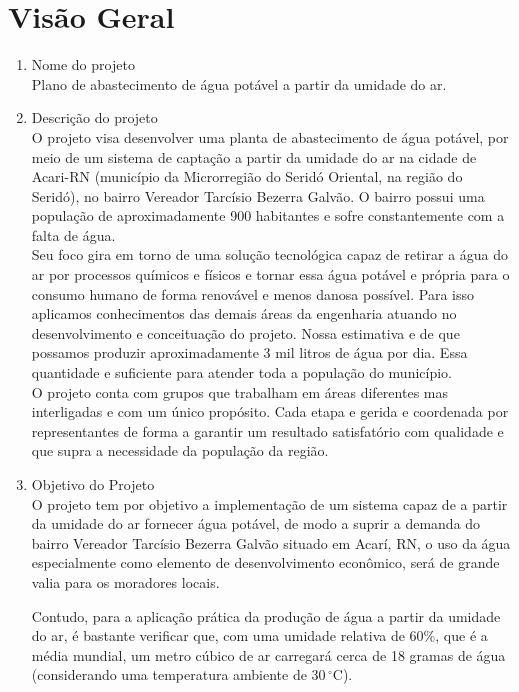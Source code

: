 \section*{Visão Geral}
\begin{enumerate}
  
  \item Nome do projeto\\
  Plano de abastecimento de água potável a partir da umidade do ar.
  
  \item Descrição do projeto\\
  O projeto visa desenvolver uma planta de abastecimento de água potável, por meio de um sistema de captação a partir da umidade do ar na cidade de Acari-RN (município da Microrregião do Seridó Oriental, na região do Seridó), no bairro Vereador Tarcísio Bezerra Galvão. O bairro possui uma população de aproximadamente 900 habitantes e sofre constantemente com a falta de água. \\
  Seu foco gira em torno de uma solução tecnológica  capaz de retirar a água do ar  por processos químicos e físicos e tornar essa água potável e própria para o consumo humano de forma renovável e menos danosa possível. Para isso aplicamos conhecimentos das demais áreas da engenharia atuando no desenvolvimento e conceituação do projeto. Nossa estimativa e de que possamos produzir aproximadamente 3 mil litros de água por dia. Essa quantidade e suficiente para atender toda a população do município. \\
  O projeto conta com grupos que trabalham em áreas diferentes mas interligadas e com um único propósito. Cada etapa e gerida e coordenada por representantes de forma a garantir um resultado satisfatório com qualidade e que supra a necessidade da população da região.

  \item Objetivo do Projeto\\
  O projeto tem por objetivo a implementação de um sistema capaz de a partir da  umidade do ar fornecer água potável, de modo a suprir a demanda do bairro Vereador Tarcísio Bezerra Galvão situado em Acarí, RN, o  uso da água especialmente como elemento de desenvolvimento econômico, será de grande valia para os moradores locais.

  Contudo, para a aplicação prática da produção de água a partir da umidade do ar, é bastante verificar que, com uma umidade relativa de 60\%, que é a média mundial, um metro cúbico de ar carregará cerca de 18 gramas de água (considerando uma temperatura ambiente de $30\,^{\circ}\mathrm{C}$). 


\end{enumerate}
